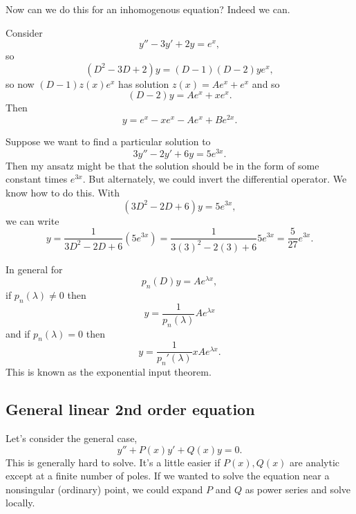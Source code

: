 Now can we do this for an inhomogenous equation? Indeed we can.
\begin{exm}
Consider
\begin{equation}
    y'' - 3y' + 2y = e^x,
\end{equation}
so
\begin{equation}
    (D^2-3D +2) y = (D-1)(D-2) y e^x,
\end{equation}
so now $(D-1)z(x) e^x$ has solution $z(x) = Ae^x + e^x$ and so
\begin{equation}
    (D-2)y = Ae^x + xe^x.
\end{equation}
Then
\begin{equation}
    y= e^x - xe^x -Ae^x + Be^{2x}.
\end{equation}
\end{exm}

\begin{exm}
Suppose we want to find a particular solution to
\begin{equation}
    3y''-2y' + 6y = 5e^{3x}.
\end{equation}
Then my ansatz might be that the solution should be in the form of some constant times $e^{3x}$. But alternately, we could invert the differential operator. We know how to do this. With
\begin{equation}
    (3D^2 -2D +6) y =5e^{3x},
\end{equation}
we can write
\begin{equation}
    y=\frac{1}{3D^2-2D + 6} (5e^{3x}) = \frac{1}{3(3)^2 - 2(3) + 6} 5e^{3x} =\frac{5}{27}e^{3x}.
\end{equation}
\end{exm}
In general for
\begin{equation}
    p_n(D) y = Ae^{\lambda x},
\end{equation}
if $p_n(\lambda) \neq 0$ then 
\begin{equation}
    y=\frac{1}{p_n(\lambda)} Ae^{\lambda x}    
\end{equation}
and if $p_n(\lambda)=0$ then 
\begin{equation}
    y=\frac{1}{p_n'(\lambda)}x Ae^{\lambda x}.
\end{equation}
This is known as the exponential input theorem.

\subsection*{General linear 2nd order equation}
Let's consider the general case,
\begin{equation}
    y'' + P(x) y' + Q(x) y=0.
\end{equation}
This is generally hard to solve. It's a little easier if $P(x),Q(x)$ are analytic except at a finite number of poles. If we wanted to solve the equation near a nonsingular (ordinary) point, we could expand $P$ and $Q$ as power series and solve locally.

